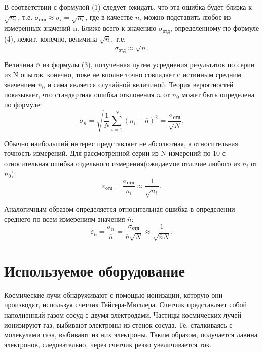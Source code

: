 \documentclass[a4paper, 12pt]{article}
\begin{document}
В соответствии с формулой (1) следует ожидать, что эта ошибка будет близка к $\sqrt{n_{i}}$, т.е. $\sigma_{отд} \approx \sigma_{i} = \sqrt{n_{i}}$, где в качестве $n_{i}$ можно подставить любое из измеренных значений n. Ближе всего к значению   $\sigma_{отд}$, определенному по формуле (4), лежит, конечно, величина $\sqrt{ \overline{n} }$, т.е.
\begin{equation}
	\sigma_{отд} \approx \sqrt{ \overline{n} }.
\end{equation} 

Величина $\overline{n}$ из формулы (3), полученная путем усреднения результатов по серии из N опытов, конечно, тоже не вполне точно совпадает с истинным средним значением $n_{0}$ и сама является случайной величиной. Теория вероятностей показывает, что стандартная ошибка отклонения $\overline{n}$ от $n_{0}$ может быть определена по формуле:\\
\begin{equation}
	\sigma_{ \overline{n} } = \sqrt{ \frac{1}{N} \sum_{i = 1}^{N} (n_{i} - \overline{n})^2 } = \frac{\sigma_{отд}}{\sqrt{N}}.
\end{equation}

Обычно наибольший интерес представляет не абсолютная, а относительная точность измерений. Для рассмотренной серии из N измерений по 10 с относительная ошибка отдельного измерения(ожидаемое отличие любого из $n_{i}$ от $n_{0}$):\\
\begin{displaymath}
	\varepsilon_{отд} = \frac{ \sigma_{отд} }{ n_{i} } \approx \frac{ 1 }{ \sqrt{n_{i}} }.	
\end{displaymath}

Аналогичным образом определяется относительная ошибка в определении среднего по всем измерениям значения $\overline{n}$:\\
\begin{equation}
	\varepsilon_{\overline{n}} = \frac{ \sigma_{\overline{n}} }{\overline{n}} = \frac{\sigma_{отд}}{\overline{n} \sqrt{N}}\approx \frac{ 1 }{ \sqrt{\overline{n} N} }.
\end{equation}

\section {Используемое оборудование}
Космические лучи обнаруживают с помощью ионизации, которую они производят, используя счетчик Гейгера-Мюллера. Счетчик представляет собой наполненный газом сосуд с двумя электродами. Частицы космических лучей ионизируют газ, выбивают электроны из стенок сосуда. Те, сталкиваясь с молекулами газа, выбивают из них электроны. Таким образом, получается лавина электронов, следовательно, через счетчик резко увеличивается ток. 
\end{document}
